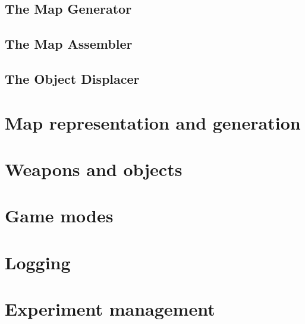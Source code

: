 \subsection{The Map Generator}

\subsection{The Map Assembler}

\subsection{The Object Displacer}


\section{Map representation and generation}


\section{Weapons and objects}


\section{Game modes}


\section{Logging}


\section{Experiment management}
